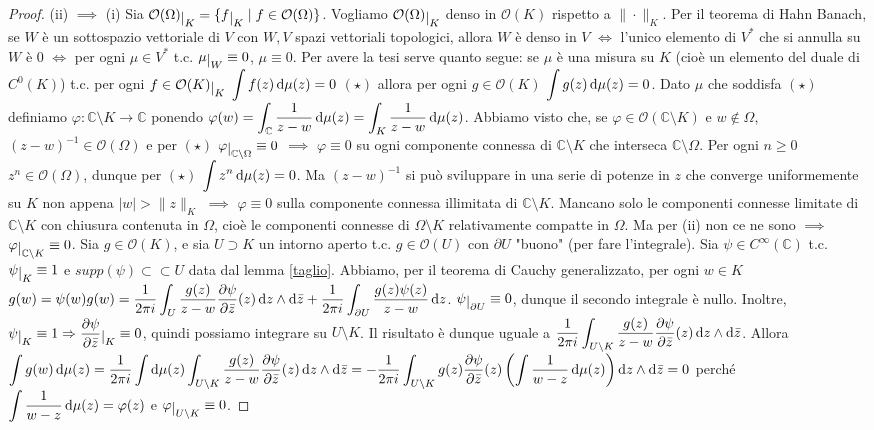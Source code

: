 \begin{proof}
  (ii) $\implies$ (i) Sia $\mathcal{O}(\Omega)\restrict{K}=\{f\restrict{K} \mid f \in \mathcal{O}(\Omega)\}$. Vogliamo $\mathcal{O}(\Omega)\restrict{K}$ denso in $\mathcal{O}(K)$ rispetto a $\|\cdot\|_K$.
  Per il teorema di Hahn Banach, se $W$ è un sottospazio vettoriale di $V$ con $W, V$ spazi vettoriali topologici, allora $W$ è denso in $V$ $\iff$ l'unico elemento di $V^*$ che si annulla su $W$ è $0$ $\iff$ per ogni $\mu \in V^*$ t.c. $\mu\restrict{W}\equiv 0$, $\mu \equiv 0$.
  Per avere la tesi serve quanto segue: se $\mu$ è una misura su $K$ (cioè un elemento del duale di $C^0(K)$) t.c. per ogni $f \in \mathcal{O}(K)\restrict{K}$ $\displaystyle \int f(z)\mathop{}\!\mathrm{d}\mu(z)=0$ $(\star)$ allora per ogni $g \in \mathcal{O}(K)$ $\displaystyle \int g(z)\mathop{}\!\mathrm{d}\mu(z)=0$.
  Dato $\mu$ che soddisfa $(\star)$ definiamo $\varphi:\mathbb{C}\setminus K \longrightarrow \mathbb{C}$ ponendo $\displaystyle \varphi(w)=\int_{\mathbb{C}} \frac{1}{z-w}\mathop{}\!\mathrm{d}\mu(z)=\int_K \frac{1}{z-w}\mathop{}\!\mathrm{d}\mu(z)$.
  Abbiamo visto che, se $\varphi \in \mathcal{O}(\mathbb{C}\setminus K)$ e $w\not\in\Omega$, $(z-w)^{-1} \in \mathcal{O}(\Omega)$ e per $(\star)$ $\varphi\restrict{\mathbb{C}\setminus \Omega}\equiv 0$ $\implies$ $\varphi \equiv 0$ su ogni componente connessa di $\mathbb{C}\setminus K$ che interseca $\mathbb{C}\setminus\Omega$.
  Per ogni $n \ge 0$ $z^n \in \mathcal{O}(\Omega)$, dunque per $(\star)$ $\displaystyle \int z^n \mathop{}\!\mathrm{d}\mu(z)=0$. Ma $(z-w)^{-1}$ si può sviluppare in una serie di potenze in $z$ che converge uniformemente su $K$ non appena $|w|>\|z\|_K$ $\implies$ $\varphi \equiv 0$ sulla componente connessa illimitata di $\mathbb{C}\setminus K$.
  Mancano solo le componenti connesse limitate di $\mathbb{C}\setminus K$ con chiusura contenuta in $\Omega$, cioè le componenti connesse di $\Omega\setminus K$ relativamente compatte in $\Omega$. Ma per (ii) non ce ne sono $\implies$ $\varphi\restrict{\mathbb{C}\setminus K}\equiv 0$. Sia $g \in \mathcal{O}(K)$, e sia $U \supset K$ un intorno aperto t.c. $g \in \mathcal{O}(U)$ con $\partial U$ "buono" (per fare l'integrale).
  Sia $\psi \in C^{\infty}(\mathbb{C})$ t.c. $\psi\restrict{K}\equiv 1$ e $supp(\psi) \subset \subset U$ data dal lemma \ref{taglio}.
  Abbiamo, per il teorema di Cauchy generalizzato, per ogni $w \in K$ $\displaystyle g(w)=\psi(w)g(w)=\frac{1}{2\pi i}\int_U \frac{g(z)}{z-w}\frac{\partial \psi}{\partial \bar{z}}(z)\mathop{}\!\mathrm{d} z\wedge\mathop{}\!\mathrm{d}\bar{z}+\frac{1}{2\pi i}\int_{\partial U} \frac{g(z)\psi(z)}{z-w}\mathop{}\!\mathrm{d} z$.
  $\psi \restrict{\partial U}\equiv 0$, dunque il secondo integrale è nullo. Inoltre, $\psi\restrict{K}\equiv 1 \implies \dfrac{\partial \psi}{\partial \bar{z}}\restrict{K}\equiv 0$, quindi possiamo integrare su $U \setminus K$.
  Il risultato è dunque uguale a $\displaystyle \frac{1}{2\pi i}\int_{U \setminus K} \frac{g(z)}{z-w}\frac{\partial \psi}{\partial\bar{z}}(z)\mathop{}\!\mathrm{d} z\wedge\mathop{}\!\mathrm{d}\bar{z}$.
  Allora $\displaystyle \int g(w)\mathop{}\!\mathrm{d}\mu(z)=\frac{1}{2\pi i}\int \mathop{}\!\mathrm{d}\mu(z)\int_{U\setminus K} \frac{g(z)}{z-w}\frac{\partial \psi}{\partial\bar{z}}(z)\mathop{}\!\mathrm{d} z\wedge\mathop{}\!\mathrm{d}\bar{z}=-\frac{1}{2\pi i}\int_{U\setminus K} g(z)\frac{\partial \psi}{\partial\bar{z}}(z)\left(\int \frac{1}{w-z} \mathop{}\!\mathrm{d}\mu(z)\right)\mathop{}\!\mathrm{d} z\wedge\mathop{}\!\mathrm{d}\bar{z}=0$ perché $\displaystyle \int \frac{1}{w-z} \mathop{}\!\mathrm{d}\mu(z)=\varphi(z)$ e $\varphi\restrict{U \setminus K}\equiv 0$.


\end{proof}
